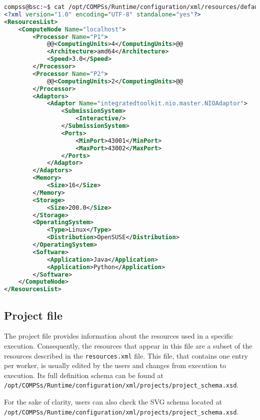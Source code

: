 \begin{lstlisting}[language=xml,moredelim={[is][\textcolor{red}]{@@}{@@}}]
compss@bsc:~$ cat /opt/COMPSs/Runtime/configuration/xml/resources/default_resources.xml
<?xml version="1.0" encoding="UTF-8" standalone="yes"?>
<ResourcesList>
    <ComputeNode Name="localhost">
        <Processor Name="P1">
            @@<ComputingUnits>4</ComputingUnits>@@
            <Architecture>amd64</Architecture>
            <Speed>3.0</Speed>
        </Processor>
        <Processor Name="P2">
            @@<ComputingUnits>2</ComputingUnits>@@
        </Processor>
        <Adaptors>
            <Adaptor Name="integratedtoolkit.nio.master.NIOAdaptor">
                <SubmissionSystem>
                    <Interactive/>
                </SubmissionSystem>
                <Ports>
                    <MinPort>43001</MinPort>
                    <MaxPort>43002</MaxPort>
                </Ports>
            </Adaptor>
        </Adaptors>
        <Memory>
            <Size>16</Size>
        </Memory>
        <Storage>
            <Size>200.0</Size>
        </Storage>
        <OperatingSystem>
            <Type>Linux</Type>
            <Distribution>OpenSUSE</Distribution>
        </OperatingSystem>
        <Software>
            <Application>Java</Application>
            <Application>Python</Application>
        </Software>
    </ComputeNode>
</ResourcesList>
\end{lstlisting}


\subsection{Project file}
The project file provides information about the resources used in a specific execution. Consequently, the resources that 
appear in this file are a subset of the resources described in the \texttt{resources.xml} file. This file, that contains
one entry per worker, is usually edited by the users and changes from execution to execution. Its full definition 
schema can be found at 
\texttt{/opt/COMPSs/Runtime/configuration/xml/projects/project\_schema.xsd}.

For the sake of clarity, users can also check the SVG schema located at \\
\texttt{/opt/COMPSs/Runtime/configuration/xml/projects/project\_schema.xsd}.

